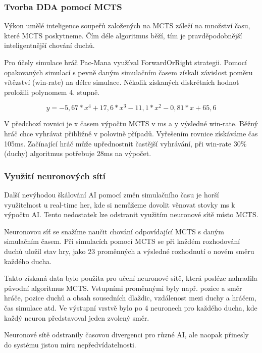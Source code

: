 \subsubsection{Tvorba DDA pomocí MCTS}

Výkon umělé inteligence soupeřů založených na MCTS záleží na množství času, které MCTS poskytneme. Čím déle algoritmus běží, tím je pravděpodobnější inteligentnější chování duchů.

Pro účely simulace hráč Pac-Mana využíval ForwardOrRight strategii.
Pomocí opakovaných simulací s pevně daným simulačním časem získali závislost poměru vítězství (win-rate) na délce simulace. Několik získaných diskrétních hodnot proložili polynomem 4. stupně.

\begin{equation}
	y=-5,67*x^4+17,6*x^3-11,1*x^2-0,81*x+65,6
\end{equation}

V předchozí rovnici je x časem výpočtu MCTS v ms a y výsledné win-rate.
Běžný hráč chce vyhrávat přibližně v polovině případů. Vyřešením rovnice získáváme čas 105ms. Začínající hráč může upřednostnit častější vyhrávání, při win-rate 30\% (duchy) algoritmus potřebuje 28ms na výpočet.

\subsubsection{Využití neuronových sítí}
Další nevýhodou škálování AI pomocí změn simulačního času je horší využitelnost u real-time her, kde si nemůžeme dovolit věnovat stovky ms k výpočtu AI. Tento nedostatek lze odstranit využitím neuronové sítě místo MCTS.

Neuronovou síť se snažíme naučit chování odpovídající MCTS s daným simulačním časem. Při simulacích pomocí MCTS se při každém rozhodování duchů uložil stav hry, jako 23 proměnných a výsledné rozhodnutí o novém směru každého ducha.

Takto získaná data bylo použita pro učení neuronové sítě, která posléze nahradila původní algoritmus MCTS. Vstupními proměnnými byly např. pozice a směr hráče, pozice duchů a obsah sousedních dlaždic, vzdálenost mezi duchy a hráčem, čas simulace atd. Ve výstupní vrstvě bylo po 4 neuronech pro každého ducha, kde každý neuron představoval jeden zvolený směr.

Neuronové sítě odstranily časovou divergenci pro různé AI, ale naopak přinesly do systému jistou míru nepředvídatelnosti.
